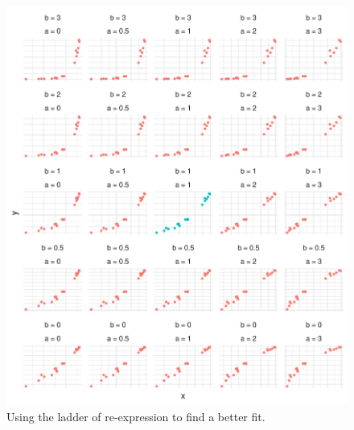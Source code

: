 \documentclass[twoside]{book}\usepackage[]{graphicx}\usepackage[]{xcolor}
\makeatletter
\def\maxwidth{ %
  \ifdim\Gin@nat@width>\linewidth
    \linewidth
  \else
    \Gin@nat@width
  \fi
}
\newenvironment{knitrout}{}{} %
\makeatother
\begin{document}
\begin{figure}
\begin{knitrout}
\color{fgcolor}

{\centering \includegraphics[width=\maxwidth]{figures/fig-tuky-bulge-many-1} 

}



\end{knitrout}
\caption{Using the ladder of re-expression to find a better fit.}
\label{fig:TukeyBulgeMany}%
\end{figure}
\end{document}
